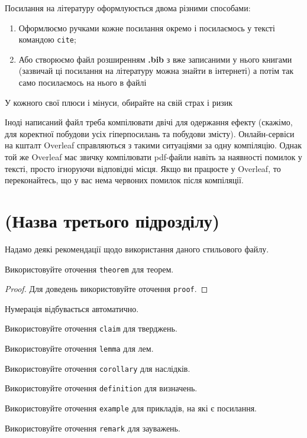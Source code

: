Посилання на літературу оформлуюється двома різними способами:
\begin{enumerate}
    \item Оформлюємо ручками кожне посилання окремо і посилаємось у тексті командою \texttt{cite};
    \item Або створюємо файл розширенням \textbf{.bib} з вже записаними у нього книгами (зазвичай ці посилання на літературу можна знайти в інтернеті)
          а потім так само посилаємось на нього в файлі
\end{enumerate}
У кожного свої плюси і мінуси, обирайте на свій страх і ризик \cite{100page_ML}\cite{linux_kernel}

Іноді написаний файл треба компілювати двічі для одержання ефекту 
(скажімо, для коректної побудови усіх гіперпосилань та побудови змісту).  
Онлайн-сервіси на кшталт Overleaf справляються з такими ситуаціями за одну компіляцію. Однак той 
же Overleaf має звичку компілювати pdf-файли навіть за наявності помилок у 
тексті, просто ігноруючи відповідні місця. Якщо ви працюєте у Overleaf, 
то переконайтесь, що у вас нема червоних помилок після компіляції.

\section{(Назва третього підрозділу)}

Надамо деякі рекомендації щодо використання даного стильового файлу.

\begin{theorem}
	Використовуйте оточення \texttt{theorem} для теорем.
\end{theorem}
\begin{proof}
	Для доведень використовуйте оточення \texttt{proof}.
\end{proof}
\begin{theorem}
	Нумерація відбувається автоматично.
\end{theorem}
\begin{claim}
	Використовуйте оточення \texttt{claim} для тверджень.
\end{claim}
\begin{lemma}
	Використовуйте оточення \texttt{lemma} для лем.
\end{lemma}
\begin{corollary}
	Використовуйте оточення \texttt{corollary} для наслідків.
\end{corollary}
\begin{definition}
	Використовуйте оточення \texttt{definition} для визначень.
\end{definition}
\begin{example}
	Використовуйте оточення \texttt{example} для прикладів, на які є посилання.
\end{example}
\begin{remark}
	Використовуйте оточення \texttt{remark} для зауважень.
\end{remark}


